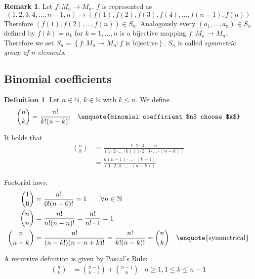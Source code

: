\documentclass[a4paper,landscape,twocolumn]{article}
\theoremstyle{definition}
\newtheorem{defi}{Definition}
\newtheorem{rem}{Remark}
\newcommand\set[1]{\left\{#1\right\}}
\begin{document}

\begin{rem}
  Let $f: M_n \rightarrow M_n$. $f$ is represented as
  \[  (1, 2, 3, 4, \ldots, n-1, n) \rightarrow (f(1), f(2), f(3), f(4), \ldots, f(n-1), f(n))  \]
  Therefore $(f(1), f(2), \ldots, f(n)) \in S_n$. Analogously every $(a_1, \ldots, a_n) \in S_n$
  defined by $f(k) = a_k$ for $k=1,\ldots,n$ is a bijective mapping $f: M_n \rightarrow M_n$.
  Therefore we set $S_n = \set{f: M_n \rightarrow M_n: f \text{ is bijective}}$.
  $S_n$ is called \emph{symmetric group of $n$ elements}.
\end{rem}

\subsection{Binomial coefficients}
\begin{defi}
  Let $n \in \mathbb{N}$, $k \in \mathbb{N}$ with $k \leq n$.
  We define \begin{align*}
    \binom{n}{k} &= \frac{n!}{k! (n-k)!}   & \text{\enquote{binomial coefficient $n$ choose $k$}}
  \end{align*}
\end{defi}

It holds that
\begin{align*}
  \binom{n}{k} &= \frac{1\cdot 2\cdot 3\cdot \ldots \cdot n}{(1 \cdot 2 \cdot \ldots \cdot k) (1 \cdot 2 \cdot 3 \cdot \ldots \cdot (n-k))} \\
               &= \frac{n (n-1) \cdot \ldots \cdot (k+1)}{(1 \cdot 2 \cdot 3 \cdot \ldots \cdot (n-k))}
\end{align*}

Factorial laws:
\begin{align*}
  \binom 10 &= \frac{n!}{0! (n-0)!} = 1 \qquad \forall n \in \mathbb{N} \\
  \binom nn &= \frac{n!}{n! (n - n)!} = \frac{n!}{n! \cdot 1} = 1 \\
  \binom{n}{n-k} &= \frac{n!}{(n-k!)(n - n + k)!} = \frac{n!}{k! (n-k)!} = \binom nk & \text{\enquote{symmetrical}}
\end{align*}

A recursive definition is given by Pascal's Rule:
\begin{align*}
    \binom nk &= \binom{n-1}{k-1} + \binom{n-1}{k}
    & n \geq 1, 1 \leq k \leq n-1
\end{align*}
\end{document}

